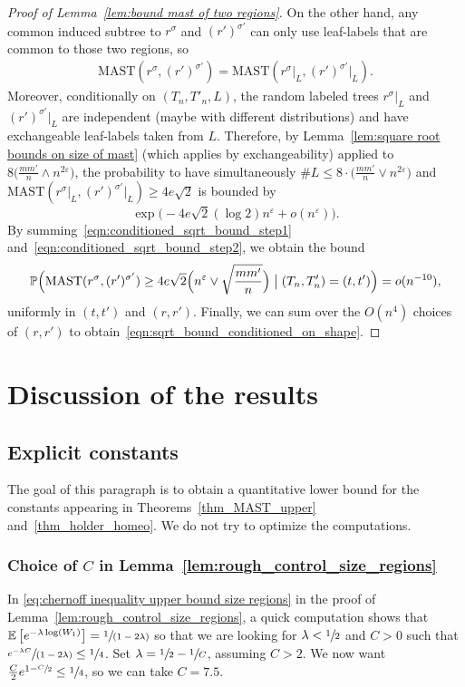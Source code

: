 \documentclass[11pt]{article}
\newcommand{\spfrac}[2]{\sfrac{#1}{(#2)}}
\newcommand{\Ec}[1]{\mathbb{E} \left[#1\right]}
\newcommand{\BPpsq}[2]{\mathbb{P} \Bigl(#1\bigm|#2\Bigr)}
\let\eps\varepsilon
\theoremstyle{plain}
\theoremstyle{definition}
\numberwithin{equation}{section}
\begin{document}
\begin{proof}[Proof of Lemma~\ref{lem:bound mast of two regions}]
On the other hand, any common induced subtree to $r^\sigma$ and $(r')^{\sigma'}$ can only use leaf-labels that are common to those two regions, so
\begin{align*}
\mathrm{MAST}(r^\sigma, (r')^{\sigma'})=\mathrm{MAST}(r^\sigma{|_L}, (r')^{\sigma'}{|_L}).
\end{align*}
Moreover, conditionally on $(T_n, T'_n,L)$, the random labeled trees $r^\sigma{|_L}$ and $(r')^{\sigma'}{|_L}$ are independent (maybe with different distributions) and have exchangeable leaf-labels taken from $L$. Therefore, by Lemma~\ref{lem:square root bounds on size of mast} (which applies by exchangeability) applied to $8 \bigl( \frac{mm'}{n} \wedge n^{2\eps} \bigr)$, the probability to have simultaneously $\#L \leq 8 \cdot \bigl(\frac{m m'}{n} \vee n^{2\eps} \bigr)$ and $\mathrm{MAST}(r^{\sigma}{|_L}, (r')^{\sigma'}{|_L})\geq 4e\sqrt{2}$ is bounded by
\begin{equation}\label{eqn:conditioned_sqrt_bound_step2}
\exp\bigl(-4e\sqrt{2}(\log 2) n^\eps + o(n^\eps) \bigr).
\end{equation}
By summing~\eqref{eqn:conditioned_sqrt_bound_step1} and~\eqref{eqn:conditioned_sqrt_bound_step2}, we obtain the bound
\[\BPpsq{\mathrm{MAST}(r^\sigma, (r')^{\sigma'})\geq 4e\sqrt{2} \Bigl( n^\eps \vee \sqrt{\frac{m m'}{n}} \Bigr)}{(T_n,T'_n)=(t,t')}=o(n^{-10}),\]
uniformly in $(t,t')$ and $(r,r')$. Finally, we can sum over the $O(n^4)$ choices of $(r,r')$ to obtain~\eqref{eqn:sqrt_bound_conditioned_on_shape}.
\end{proof}

\section{Discussion of the results} \label{sec:discussion of the results}

\subsection{Explicit constants}\label{subsec:explicit constants}

The goal of this paragraph is to obtain a quantitative lower bound for the constants appearing in Theorems~\ref{thm_MAST_upper} and~\ref{thm_holder_homeo}. We do not try to optimize the computations.

\subsubsection*{Choice of $C$ in Lemma~\ref{lem:rough_control_size_regions}}
In \eqref{eq:chernoff inequality upper bound size regions} in the proof of Lemma~\ref{lem:rough_control_size_regions}, a quick computation shows that $\Ec{e^{-\lambda \log(W_1)}}= \spfrac{1}{1-2\lambda}$ so that we are looking for $\lambda<\sfrac{1}{2}$ and $C>0$ such that $\spfrac{e^{-\lambda C}}{1-2\lambda} \leq \sfrac{1}{4}$.
Set $\lambda=\sfrac{1}{2}-\sfrac{1}{C}$, assuming $C>2$. We now want $\frac{C}{2}e^{1-\sfrac{C}{2}} \leq \sfrac{1}{4}$, so we can take $C=7.5$.
\end{document}
